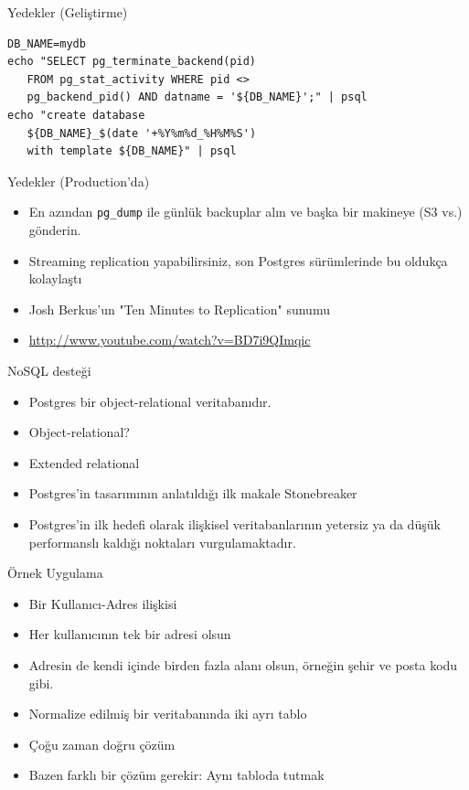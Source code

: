\documentclass[presentation]{beamer}
\begin{document}
\begin{frame}[fragile,label=sec-19]{Yedekler (Geliştirme)}
 \begin{verbatim}
DB_NAME=mydb
echo "SELECT pg_terminate_backend(pid)
   FROM pg_stat_activity WHERE pid <>
   pg_backend_pid() AND datname = '${DB_NAME}';" | psql
echo "create database
   ${DB_NAME}_$(date '+%Y%m%d_%H%M%S')
   with template ${DB_NAME}" | psql
\end{verbatim}
\end{frame}

\begin{frame}[fragile,label=sec-20]{Yedekler (Production'da)}
 \begin{itemize}
\item En azından \texttt{pg\_dump} ile günlük backuplar alın ve başka bir makineye (S3 vs.) gönderin.
\item Streaming replication yapabilirsiniz, son Postgres sürümlerinde bu oldukça
kolaylaştı
\item Josh Berkus'un "Ten Minutes to Replication" sunumu
\item \url{http://www.youtube.com/watch?v=BD7i9QImqic}
\end{itemize}
\end{frame}


\begin{frame}[label=sec-21]{NoSQL desteği}
\begin{itemize}
\item Postgres bir object-relational veritabanıdır.
\item Object-relational?
\item Extended relational
\item Postgres'in tasarımının anlatıldığı ilk makale Stonebreaker
\item Postgres'in ilk hedefi olarak ilişkisel veritabanlarının yetersiz ya da düşük
performanslı kaldığı noktaları vurgulamaktadır.
\end{itemize}
\end{frame}

\begin{frame}[label=sec-22]{Örnek Uygulama}
\begin{itemize}
\item Bir Kullanıcı-Adres ilişkisi
\item Her kullanıcının tek bir adresi olsun
\item Adresin de kendi içinde birden fazla alanı olsun, örneğin şehir ve posta kodu gibi.

\item Normalize edilmiş bir veritabanında iki ayrı tablo
\item Çoğu zaman doğru çözüm
\item Bazen farklı bir çözüm gerekir: Aynı tabloda tutmak
\end{itemize}
\end{frame}
\end{document}
